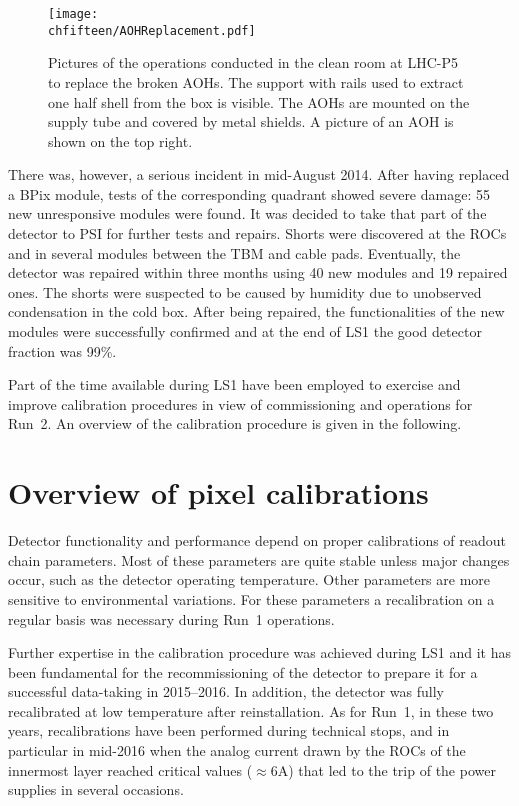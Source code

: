 \begin{figure}[!htb]
 \begin{center}
 \texttt{[image: \\chfifteen/AOHReplacement.pdf]}
 \end{center}
 \caption{Pictures of the operations conducted in the clean room at LHC-P5 to replace the broken AOHs. The support with rails used to extract one half shell from the box is visible.
 The AOHs are mounted on the supply tube and covered by metal shields. A picture of an AOH is shown on the top right.}
 \label{fig:AOHreplace}
\end{figure}

There was, however, a serious incident in mid-August 2014. After having replaced a BPix module, tests of the corresponding quadrant showed severe damage: 55 new unresponsive modules were found.
It was decided to take that part of the detector to PSI for further tests and repairs. Shorts were discovered at the ROCs and in several modules between the TBM and cable pads. Eventually, the detector was repaired within three months using 40 new modules and 19 repaired ones. The shorts were suspected to be caused by humidity due to unobserved condensation in the cold box. 
After being repaired, the functionalities of the new modules were successfully confirmed and at the end of LS1 the good detector fraction was 99\%.

Part of the time available during LS1 have been employed to exercise and improve calibration procedures in view of commissioning and operations for Run~2.
An overview of the calibration procedure is given in the following.

\section{Overview of pixel calibrations}

Detector functionality and performance depend on proper calibrations of readout chain parameters.
Most of these parameters are quite stable unless major changes occur, such as the detector operating temperature.
Other parameters are more sensitive to environmental variations.
For these parameters a recalibration on a regular basis was necessary during Run~1 operations.

Further expertise in the calibration procedure was achieved during LS1 and it has been fundamental 
for the recommissioning of the detector to prepare it for a successful data-taking in 2015--2016.
In addition, the detector was fully recalibrated at low temperature after reinstallation.
As for Run~1, in these two years, recalibrations have been performed during technical stops, and in particular in mid-2016 when the analog current drawn by the ROCs of the innermost layer reached critical values ($\approx6$\unit{A}) that led to the trip of the power supplies in several occasions.

